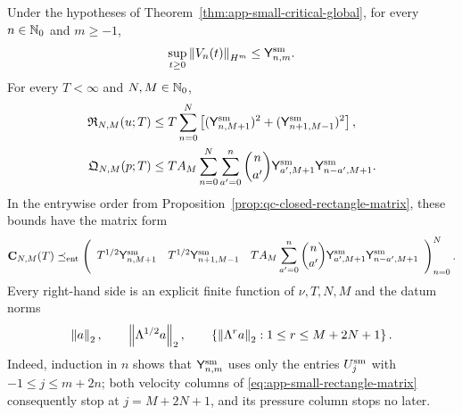 \begin{proposition}
\label{prop:app-small-data-rectangles}
Under the hypotheses of Theorem~\ref{thm:app-small-critical-global}, for
every \(n\in\mathbb N_0\) and \(m\ge-1\),
\begin{equation}
 \sup_{t\ge0}\left\lVert V_n(t)\right\rVert_{H^m}
 \le\mathsf Y_{n,m}^{\rm sm}.
 \label{eq:app-small-time-row}
\end{equation}
For every \(T<\infty\) and \(N,M\in\mathbb N_0\),
\begin{align}
 \mathfrak R_{N,M}(u;T)
 &\le
 T\sum_{n=0}^{N}
 \left[
 (\mathsf Y_{n,M+1}^{\rm sm})^2
 +(\mathsf Y_{n+1,M-1}^{\rm sm})^2
 \right],
 \label{eq:app-small-rectangle}\\
 \mathfrak Q_{N,M}(p;T)
 &\le
 TA_M\sum_{n=0}^{N}\sum_{a'=0}^{n}\binom n{a'}
 \mathsf Y_{a',M+1}^{\rm sm}
 \mathsf Y_{n-a',M+1}^{\rm sm}.
 \label{eq:app-small-pressure-rectangle}
\end{align}
In the entrywise order from
Proposition~\ref{prop:qc-closed-rectangle-matrix}, these bounds have the
matrix form
\begin{equation}
 \mathbf C_{N,M}(T)
 \preceq_{\rm ent}
 \left(
 \begin{array}{ccc}
  T^{1/2}\mathsf Y_{n,M+1}^{\rm sm}
  &T^{1/2}\mathsf Y_{n+1,M-1}^{\rm sm}
  &TA_M\displaystyle\sum_{a'=0}^{n}\binom n{a'}
    \mathsf Y_{a',M+1}^{\rm sm}
    \mathsf Y_{n-a',M+1}^{\rm sm}
 \end{array}
 \right)_{n=0}^{N}.
 \label{eq:app-small-rectangle-matrix}
\end{equation}
Every right-hand side is an explicit finite function of \(\nu,T,N,M\) and
the datum norms
\begin{equation}
 \left\lVert a\right\rVert_2,\qquad
 \left\lVert \Lambda^{1/2}a\right\rVert_2,\qquad
 \left\{\left\lVert \Lambda^ra\right\rVert_2:
  1\le r\le M+2N+1\right\}.
 \label{eq:app-small-data-derivative-ceiling}
\end{equation}
Indeed, induction in \(n\) shows that
\(\mathsf Y_{n,m}^{\rm sm}\) uses only the entries
\(U_j^{\rm sm}\) with \(-1\le j\le m+2n\); both velocity columns of
\eqref{eq:app-small-rectangle-matrix} consequently stop at
\(j=M+2N+1\), and its pressure column stops no later.
\end{proposition}

